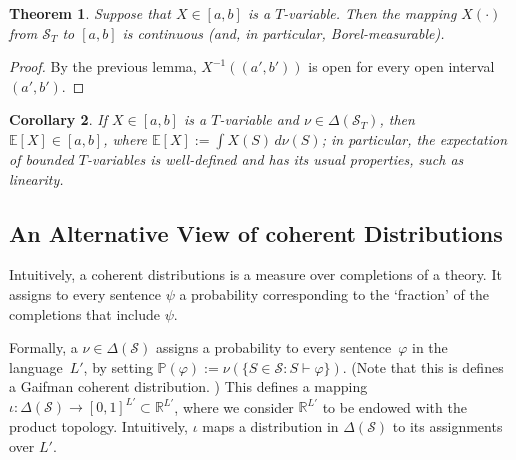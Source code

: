 \documentclass[12pt]{article}
\newcommand{\PP}{\mathbb{P}}
\newcommand{\vp}{\varphi}
\newcommand{\EE}{\mathbb{E}}
\newcommand{\RR}{\mathbb{R}}
\newcommand{\cL}{L'}
\newcommand{\cS}{\mathcal{S}}
\newcommand{\Tvar}{$T$-variable}
\theoremstyle{plain}
\newtheorem{theorem}{Theorem}[subsection]
\newtheorem{corollary}[theorem]{Corollary}
\theoremstyle{definition}
\theoremstyle{remark}
\begin{document}
\begin{theorem}
Suppose that $X\in[a,b]$ is a \Tvar{}. Then the mapping $X(\cdot)$ from $\cS_T$ to $[a,b]$ is continuous (and, in particular, Borel-measurable).
\end{theorem}
\begin{proof}
By the previous lemma, $X^{-1}((a',b'))$ is open for every open interval $(a',b')$.

\end{proof}
\begin{corollary}
If $X\in[a,b]$ is a \Tvar{} and $\nu\in\Delta(\cS_T)$, then $\EE[X]\in[a,b]$, where $\EE[X] := \int X(S)\,d\nu(S)$; in particular, the expectation of bounded \Tvar{}s is well-defined and has its usual properties, such as linearity.
\end{corollary}
\subsection{An Alternative View of coherent Distributions} \label{An Alternative View of coherent Distributions}
Intuitively, a coherent distributions is a measure over completions of a theory. 
It assigns to every sentence $\psi$ a probability corresponding to the `fraction' of the completions that include $\psi$.

Formally, a $\nu\in\Delta(\cS)$ assigns a probability to every sentence~$\vp$ in the language~$\cL$, by setting $\PP(\vp) := \nu(\{S\in\cS:S\vdash\vp\})$. (Note that this is defines a Gaifman coherent distribution.
)
This defines a mapping $\iota : \Delta(\cS)\to [0,1]^{L'}\subset\RR^{L'}$, where we consider $\RR^{L'}$ to be endowed with the product topology. 
Intuitively, $\iota$ maps a distribution in $\Delta(\cS)$ to its assignments over $\cL$.
\end{document}
